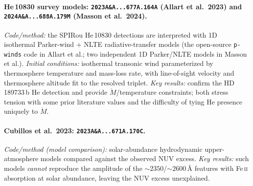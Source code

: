 \paragraph{He\,10830 survey models: \texttt{2023A\&A...677A.164A} (Allart et al.\ 2023) and \texttt{2024A\&A...688A.179M} (Masson et al.\ 2024).}
\emph{Code/method:} the SPIRou He\,10830 detections are interpreted with 1D
isothermal Parker-wind + NLTE radiative-transfer models (the open-source
\texttt{p-winds} code in Allart et al.; two independent 1D Parker/NLTE models in
Masson et al.).
\emph{Initial conditions:} isothermal transonic wind parameterized by
thermosphere temperature and mass-loss rate, with line-of-sight velocity and
thermosphere altitude fit to the resolved triplet.
\emph{Key results:} confirm the HD\,189733\,b He detection and provide
$\dot{M}$/temperature constraints; both stress tension with some prior
literature values and the difficulty of tying He presence uniquely to
$\dot{M}$.

\paragraph{Cubillos et al.\ 2023: \texttt{2023A\&A...671A.170C}.}
\emph{Code/method (model comparison):} solar-abundance hydrodynamic
upper-atmosphere models compared against the observed NUV excess.
\emph{Key results:} such models \emph{cannot} reproduce the amplitude of the
$\sim2350$/$\sim2600$\,\AA{} features with Fe\,\textsc{ii} absorption at solar
abundance, leaving the NUV excess unexplained.
